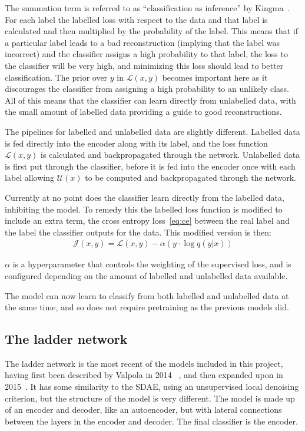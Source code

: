 The summation term is referred to as ``classification as inference'' by Kingma~\cite{DBLP:journals/corr/KingmaRMW14}. For each label the labelled loss with 
respect to the data and that label is calculated and then multiplied by the probability of the label. This means that if a particular label
leads to a bad reconstruction (implying that the label was incorrect) and the classifier assigns a high probability to that label, 
the loss to the classifier will be very high, and minimizing this loss should lead to better classification. The prior over $y$ in $\mathcal{L}(x, y)$
becomes important here as it discourages the classifier from assigning a high probability to an unlikely class. All of this means that 
the classifier can learn directly from unlabelled data, with the small amount of labelled data providing a guide to good reconstructions.

The pipelines for labelled and unlabelled data are slightly different. Labelled data is fed directly into the encoder
along with its label, and the loss function $\mathcal{L}(x, y)$ is calculated and backpropagated through the network. Unlabelled data is 
first put through the classifier, before it is fed into the encoder once with each label allowing $\mathcal{U}(x)$ to be computed and 
backpropagated through the network.

Currently at no point does the classifier learn directly from the labelled data, inhibiting the model. To remedy
this the labelled loss function is modified to include an extra term, the cross entropy loss~\eqref{eq:ce} between the real label and the 
label the classifier outputs for the data. This modified version is then:
\begin{align}
  \mathcal{J}(x, y) = \mathcal{L}(x, y) - \alpha (y \cdot \log q(y|x))
\end{align}

$\alpha$ is a hyperparameter that controls the weighting of the supervised loss, and is configured depending on the amount of labelled and 
unlabelled data available.

The model can now learn to classify from both labelled and unlabelled data at the same time, and so does not require pretraining as
the previous models did.

\subsection{The ladder network} \label{ladder}

The ladder network is the most recent of the models included in this project, having first been described by Valpola in 2014
~\cite{DBLP:journals/corr/Valpola14}, and then expanded upon in 2015~\cite{DBLP:journals/corr/RasmusVHBR15}. 
It has some similarity to the SDAE, using an unsupervised local denoising criterion, but the structure of the model is very different.
The model is made up of an encoder and decoder, like an autoencoder, but with lateral connections between the layers in the encoder 
and decoder. The final classifier is the encoder.

